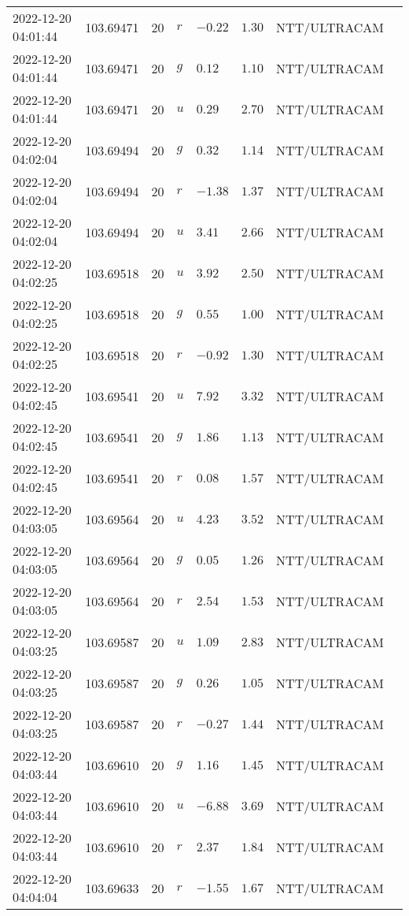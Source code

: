 \documentclass{nature_plusfigure}
\begin{document}
\begin{supplement}
\begin{center}
\begin{longtable}{llllllll}
2022-12-20 04:01:44 & 103.69471 & 20 & $r$ & $-0.22$ & $1.30$ & NTT/ULTRACAM &  \\ 
2022-12-20 04:01:44 & 103.69471 & 20 & $g$ & $0.12$ & $1.10$ & NTT/ULTRACAM &  \\ 
2022-12-20 04:01:44 & 103.69471 & 20 & $u$ & $0.29$ & $2.70$ & NTT/ULTRACAM &  \\ 
2022-12-20 04:02:04 & 103.69494 & 20 & $g$ & $0.32$ & $1.14$ & NTT/ULTRACAM &  \\ 
2022-12-20 04:02:04 & 103.69494 & 20 & $r$ & $-1.38$ & $1.37$ & NTT/ULTRACAM &  \\ 
2022-12-20 04:02:04 & 103.69494 & 20 & $u$ & $3.41$ & $2.66$ & NTT/ULTRACAM &  \\ 
2022-12-20 04:02:25 & 103.69518 & 20 & $u$ & $3.92$ & $2.50$ & NTT/ULTRACAM &  \\ 
2022-12-20 04:02:25 & 103.69518 & 20 & $g$ & $0.55$ & $1.00$ & NTT/ULTRACAM &  \\ 
2022-12-20 04:02:25 & 103.69518 & 20 & $r$ & $-0.92$ & $1.30$ & NTT/ULTRACAM &  \\ 
2022-12-20 04:02:45 & 103.69541 & 20 & $u$ & $7.92$ & $3.32$ & NTT/ULTRACAM &  \\ 
2022-12-20 04:02:45 & 103.69541 & 20 & $g$ & $1.86$ & $1.13$ & NTT/ULTRACAM &  \\ 
2022-12-20 04:02:45 & 103.69541 & 20 & $r$ & $0.08$ & $1.57$ & NTT/ULTRACAM &  \\ 
2022-12-20 04:03:05 & 103.69564 & 20 & $u$ & $4.23$ & $3.52$ & NTT/ULTRACAM &  \\ 
2022-12-20 04:03:05 & 103.69564 & 20 & $g$ & $0.05$ & $1.26$ & NTT/ULTRACAM &  \\ 
2022-12-20 04:03:05 & 103.69564 & 20 & $r$ & $2.54$ & $1.53$ & NTT/ULTRACAM &  \\ 
2022-12-20 04:03:25 & 103.69587 & 20 & $u$ & $1.09$ & $2.83$ & NTT/ULTRACAM &  \\ 
2022-12-20 04:03:25 & 103.69587 & 20 & $g$ & $0.26$ & $1.05$ & NTT/ULTRACAM &  \\ 
2022-12-20 04:03:25 & 103.69587 & 20 & $r$ & $-0.27$ & $1.44$ & NTT/ULTRACAM &  \\ 
2022-12-20 04:03:44 & 103.69610 & 20 & $g$ & $1.16$ & $1.45$ & NTT/ULTRACAM &  \\ 
2022-12-20 04:03:44 & 103.69610 & 20 & $u$ & $-6.88$ & $3.69$ & NTT/ULTRACAM &  \\ 
2022-12-20 04:03:44 & 103.69610 & 20 & $r$ & $2.37$ & $1.84$ & NTT/ULTRACAM &  \\ 
2022-12-20 04:04:04 & 103.69633 & 20 & $r$ & $-1.55$ & $1.67$ & NTT/ULTRACAM &  \\ 

\end{longtable}
\end{center}
\end{supplement}
\end{document}
